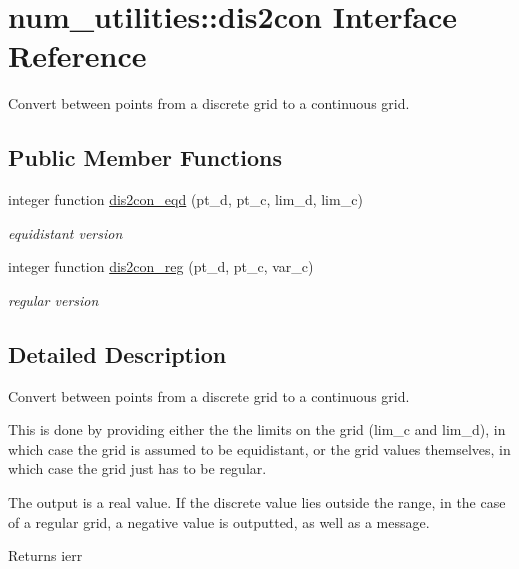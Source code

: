 \hypertarget{interfacenum__utilities_1_1dis2con}{}\section{num\+\_\+utilities\+:\+:dis2con Interface Reference}
\label{interfacenum__utilities_1_1dis2con}


Convert between points from a discrete grid to a continuous grid.  


\subsection*{Public Member Functions}
\begin{DoxyCompactItemize}
\item 
integer function \hyperlink{interfacenum__utilities_1_1dis2con_a448a115b0331a5fb9510a98e599fa3d4}{dis2con\+\_\+eqd} (pt\+\_\+d, pt\+\_\+c, lim\+\_\+d, lim\+\_\+c)
\begin{DoxyCompactList}\small\item\em equidistant version \end{DoxyCompactList}\item 
integer function \hyperlink{interfacenum__utilities_1_1dis2con_afb9291df704a01572f2541a06e4fa397}{dis2con\+\_\+reg} (pt\+\_\+d, pt\+\_\+c, var\+\_\+c)
\begin{DoxyCompactList}\small\item\em regular version \end{DoxyCompactList}\end{DoxyCompactItemize}


\subsection{Detailed Description}
Convert between points from a discrete grid to a continuous grid. 

This is done by providing either the the limits on the grid ({\ttfamily lim\+\_\+c} and {\ttfamily lim\+\_\+d}), in which case the grid is assumed to be equidistant, or the grid values themselves, in which case the grid just has to be regular.

The output is a real value. If the discrete value lies outside the range, in the case of a regular grid, a negative value is outputted, as well as a message.

\begin{DoxyReturn}{Returns}
ierr 
\end{DoxyReturn}


